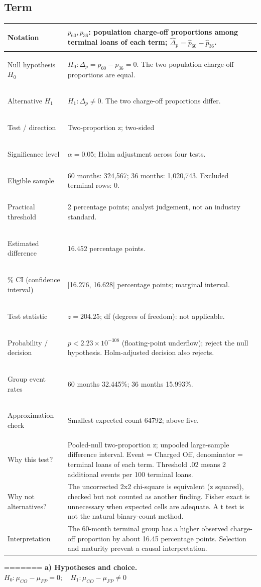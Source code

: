 \documentclass[10pt,a4paper,twocolumn]{article}
\begin{document}
\subsection{Term}
\begin{tabularx}{\linewidth}{@{}>{\bfseries\raggedright\arraybackslash}p{.28\linewidth} X@{}}\toprule
Notation & \(p_{60},p_{36}\): population charge-off proportions among terminal loans of each term; \(\widehat\Delta_p=\widehat p_{60}-\widehat p_{36}\).\\\midrule
Null hypothesis \(H_0\) & \(H_0:\Delta_p=p_{60}-p_{36}=0\). The two population charge-off proportions are equal.\\\midrule
Alternative \(H_1\) & \(H_1:\Delta_p\ne0\). The two charge-off proportions differ.\\\midrule
Test / direction & Two-proportion z; two-sided\\\midrule
Significance level & \(\alpha=0.05\); Holm adjustment across four tests.\\\midrule
Eligible sample & 60 months: 324,567; 36 months: 1,020,743. Excluded terminal rows: 0.\\\midrule
Practical threshold & 2 percentage points; analyst judgement, not an industry standard.\\\midrule
Estimated difference & 16.452 percentage points.\\\midrule
95\% CI (confidence interval) & [16.276, 16.628] percentage points; marginal interval.\\\midrule
Test statistic & \(z=204.25\); df (degrees of freedom): not applicable.\\\midrule
Probability / decision & \(p<2.23\times10^{-308}\) (floating-point underflow); reject the null hypothesis. Holm-adjusted decision also rejects.\\\midrule
Group event rates & 60 months 32.445\%; 36 months 15.993\%.\\\midrule
Approximation check & Smallest expected count 64792; above five.\\\midrule
Why this test? & Pooled-null two-proportion z; unpooled large-sample difference interval. Event = Charged Off, denominator = terminal loans of each term. Threshold .02 means 2 additional events per 100 terminal loans.\\\midrule
Why not alternatives? & The uncorrected 2x2 chi-square is equivalent (z squared), checked but not counted as another finding. Fisher exact is unnecessary when expected cells are adequate. A t test is not the natural binary-count method.\\\midrule
Interpretation & The 60-month terminal group has a higher observed charge-off proportion by about 16.45 percentage points. Selection and maturity prevent a causal interpretation.\\\bottomrule\end{tabularx}
=======
\textbf{a) Hypotheses and choice.} \(H_0:\mu_{CO}-\mu_{FP}=0;\quad H_1:\mu_{CO}-\mu_{FP}\ne0\)
\end{document}
